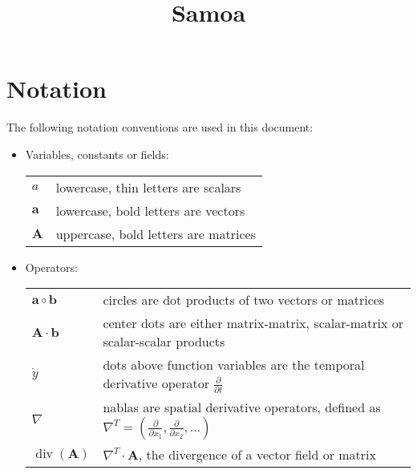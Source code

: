 \documentclass{IOS-Book-Article}
\theoremstyle{plain}
\theoremstyle{definition}
\DeclareMathOperator{\diverg}{div}
\begin{document}
\begin{frontmatter}                           %

\title{Samoa}

\author[A]{ }


\begin{abstract}
\end{abstract}

\begin{keyword}
\end{keyword}
\end{frontmatter}

\thispagestyle{empty}
\pagestyle{empty}

\newpage
\section{Notation}

The following notation conventions are used in this document:
\begin{itemize}
	\item Variables, constants or fields: \\
	\begin{tabular}{ll}
		$a$ & lowercase, thin letters are scalars \\
		$\mathbf a$ & lowercase, bold letters are vectors \\
		$\mathbf A$ & uppercase, bold letters are matrices \\
	\end{tabular}
	\item Operators: \\
	\begin{tabular}{ll}
		$\mathbf a \circ \mathbf b$ & circles are dot products of two vectors or matrices \\
		$\mathbf A \cdot \mathbf b$ & center dots are either matrix-matrix, scalar-matrix or scalar-scalar products \\
		$\dot y$ & dots above function variables are the temporal derivative operator $\frac{\partial}{\partial t}$ \\
		$\nabla $ & nablas are spatial derivative operators, defined as
		$\nabla^T = \left(\frac{\partial}{\partial x_1}, \frac{\partial}{\partial x_2}, \dots \right)$ \\
		$\diverg(\mathbf A)$ & $\nabla ^T \cdot \mathbf A$, the divergence of a vector field or matrix
	\end{tabular}
\end {itemize}
\end{document}
